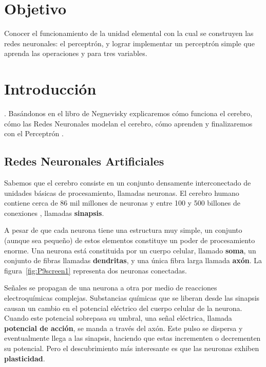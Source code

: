 


\section{Objetivo}

Conocer el funcionamiento de la unidad elemental con la cual se construyen las redes neuronales: el perceptrón, y lograr implementar un perceptrón simple que aprenda las operaciones  y  para tres variables.

\section{Introducci\'on}

 \parencite[166]{Nengnevitsky2005}. Basándonos en el libro de Negnevisky explicaremos cómo funciona el cerebro, cómo las Redes Neuronales modelan el cerebro, cómo aprenden y finalizaremos con el Perceptrón \parencite[cap. 6]{Nengnevitsky2005}.


\subsection{Redes Neuronales Artificiales}

Sabemos que el cerebro consiste en un conjunto densamente interconectado de unidades básicas de procesamiento, llamadas neuronas. El cerebro humano contiene cerca de 86 mil millones de neuronas \parencite{Herculano-Houzel2009} y entre 100 y 500 billones de conexiones \parencite{Drachman2005}, llamadas \textbf{sinapsis}.\par

A pesar de que cada neurona tiene una estructura muy simple, un conjunto (aunque sea pequeño) de estos elementos constituye un poder de procesamiento enorme. Una neurona está constituida por un cuerpo celular, llamado \textbf{soma}, un conjunto de fibras llamadas \textbf{dendritas}, y una única fibra larga llamada \textbf{axón}. La figura~\ref{fig:P9screen1} representa dos neuronas conectadas.

Señales se propagan de una neurona a otra por medio de reacciones electroquímicas complejas. Substancias químicas que se liberan desde las sinapsis causan un cambio en el potencial eléctrico del cuerpo celular de la neurona. Cuando este potencial sobrepasa su umbral, una señal eléctrica, llamada \textbf{potencial de acción}, se manda a través del axón. Este pulso se dispersa y eventualmente llega a las sinapsis, haciendo que estas incrementen o decrementen su potencial. Pero el descubrimiento más interesante es que las neuronas exhiben \textbf{plasticidad}.\par

